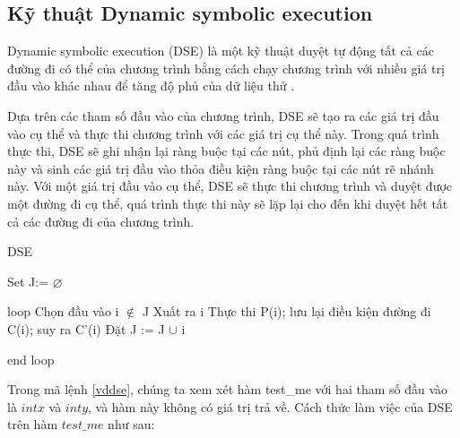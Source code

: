\subsection{Kỹ thuật Dynamic symbolic execution}

Dynamic symbolic execution (DSE) là một kỹ thuật duyệt tự động tất cả các đường đi có thể của chương trình bằng cách chạy chương trình với nhiều giá trị đầu vào khác nhau để tăng độ phủ của dữ liệu thử \cite{xie2009fitness}.

Dựa trên các tham số đầu vào của chương trình, DSE sẽ tạo ra các giá trị đầu vào cụ thể và thực thi chương trình với các giá trị cụ thể này. Trong quá trình thực thi, DSE sẽ ghi nhận lại ràng buộc tại các nút, phủ định lại các ràng buộc này và sinh các giá trị đầu vào thỏa điều kiện ràng buộc tại các nút rẽ nhánh này. Với một giá trị đầu vào cụ thể, DSE sẽ thực thi chương trình và duyệt được một đường đi cụ thể, quá trình thực thi này sẽ lặp lại cho đến khi duyệt hết tất cả các đường đi của chương trình.

\begin{algorithm}
	\caption{DSE}
	\begin{algorithmic}
        \item Set J:= $\varnothing $ 
        \item loop \subitem Chọn đầu vào i $\notin $ J  \subitem Xuất ra i
          \subitem Thực thi P(i); lưu lại điều kiện đường đi C(i); suy
          ra C'(i) \subitem Đặt J := J $\cup $ i
        \item end loop
	\end{algorithmic}
\end{algorithm}


	
Trong mã lệnh \ref{vddse}, chúng ta xem xét hàm test\_me với hai tham số đầu vào là $int x$ và $int y$, và hàm này không có giá trị trả về. Cách thức làm việc của DSE trên hàm $test\_me$ như sau: 

